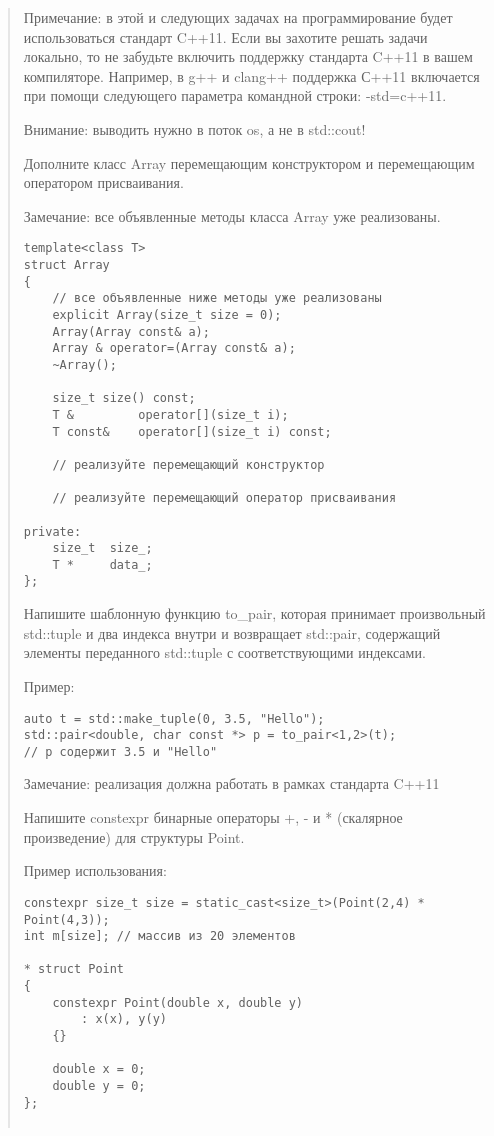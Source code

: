 \documentclass[]{article}
\begin{document}
\begin{quote}
Примечание: в этой и следующих задачах на программирование будет использоваться стандарт C++11. Если вы захотите решать задачи локально, то не забудьте включить поддержку стандарта C++11 в вашем компиляторе. Например, в g++ и clang++ поддержка С++11 включается при помощи следующего параметра командной строки: -std=c++11.

Внимание: выводить нужно в поток os, а не в std::cout!




Дополните класс Array перемещающим конструктором и перемещающим оператором присваивания.

Замечание: все объявленные методы класса Array уже реализованы.
\begin{verbatim}
template<class T>
struct Array
{
    // все объявленные ниже методы уже реализованы
    explicit Array(size_t size = 0);
    Array(Array const& a);
    Array & operator=(Array const& a);
    ~Array();

    size_t size() const;
    T &         operator[](size_t i);
    T const&    operator[](size_t i) const;

    // реализуйте перемещающий конструктор

    // реализуйте перемещающий оператор присваивания

private:    
    size_t  size_;
    T *     data_;    
};

\end{verbatim}
Напишите шаблонную функцию to\_pair, которая принимает произвольный std::tuple и два индекса внутри и возвращает std::pair, содержащий элементы переданного std::tuple с соответствующими индексами.

Пример:
\begin{verbatim}
auto t = std::make_tuple(0, 3.5, "Hello");
std::pair<double, char const *> p = to_pair<1,2>(t); 
// p содержит 3.5 и "Hello"
\end{verbatim}

Замечание: реализация должна работать в рамках стандарта C++11

Напишите constexpr бинарные операторы +, - и * (скалярное произведение) для структуры Point.

Пример использования:
\begin{verbatim}
constexpr size_t size = static_cast<size_t>(Point(2,4) * Point(4,3));
int m[size]; // массив из 20 элементов

* struct Point
{
    constexpr Point(double x, double y) 
        : x(x), y(y) 
    {}

    double x = 0;
    double y = 0;
};


\end{verbatim}
\end{quote}
\end{document}
